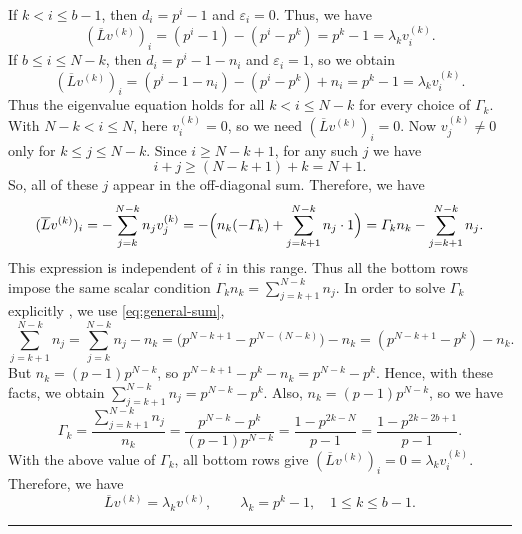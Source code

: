 \documentclass[12pt,twoside]{article}
\renewenvironment{proof}{{\noindent\bfseries Proof.}}{\qed}
\def\qed{\nolinebreak\hfill\rule{.2cm}{.2cm}\par\addvspace{.5cm}}
\begin{document}
\begin{proof}
	If $k<i\le b-1$, then $d_i=p^i-1$ and $\varepsilon_i=0$.
	Thus, we have
	\[
	(\overline{L}v^{(k)})_i
	= (p^i-1) - (p^i-p^k)
	= p^k-1
	= \lambda_k v^{(k)}_i.
	\]
	If $b\le i\le N-k$, then $d_i=p^i-1-n_i$ and
	$\varepsilon_i=1$, so we obtain 
	\[
	(\overline{L}v^{(k)})_i
	= (p^i-1-n_i) - (p^i-p^k) + n_i
	= p^k-1
	= \lambda_k v^{(k)}_i.
	\]
	Thus the eigenvalue equation holds for all $k<i\le N-k$ for every
	choice of $ \varGamma_k$. With $N-k < i\le N$, here $v^{(k)}_i=0$, so we need $(\overline{L}v^{(k)})_i=0$.
	Now $v^{(k)}_j\ne 0$ only for $k\le j\le N-k$. Since
	$i\ge N-k+1$, for any such $j$ we have
	\[
	i+j \ge (N-k+1)+k = N+1.
	\]
	So, all of these $j$ appear in the off-diagonal sum. Therefore, we have
	\[
	(\overline{L}v^{(k)})_i
	= -\sum_{j=k}^{N-k} n_j v^{(k)}_j
	= -\Bigl(n_k(- \varGamma_k) + \sum_{j=k+1}^{N-k} n_j\cdot1\Bigr)
	=  \varGamma_k n_k - \sum_{j=k+1}^{N-k} n_j.
	\]
	This expression is independent of $i$ in this range. Thus all the
	bottom rows impose the same scalar condition $	 \varGamma_k n_k = \sum_{j=k+1}^{N-k} n_j.$
	In order to  solve  $ \varGamma_k$ explicitly , we use \eqref{eq:general-sum},
	\[
	\sum_{j=k+1}^{N-k} n_j
	= \sum_{j=k}^{N-k} n_j - n_k
	= \bigl(p^{N-k+1}-p^{N-(N-k)}\bigr) - n_k
	= (p^{N-k+1}-p^k) - n_k.
	\]
	But $n_k=(p-1)p^{N-k}$, so $	p^{N-k+1}-p^k-n_k = p^{N-k}-p^k.$
	Hence, with these facts, we obtain $	\sum_{j=k+1}^{N-k} n_j = p^{N-k}-p^k.$ Also, $n_k = (p-1)p^{N-k}$, so we have
	\[
	 \varGamma_k
	= \frac{\sum_{j=k+1}^{N-k} n_j}{n_k}
	= \frac{p^{N-k}-p^k}{(p-1)p^{N-k}}
	= \frac{1-p^{2k-N}}{p-1}
	= \frac{1-p^{ 2k-2b+1}}{p-1}.
	\]
	With the above value of $ \varGamma_k$, all bottom rows give $(\overline{L}v^{(k)})_i=0=\lambda_k v^{(k)}_i$. Therefore, we have 
	\[
	\overline{L}v^{(k)} = \lambda_k v^{(k)},\qquad
	\lambda_k=p^k-1,\quad 1\le k\le b-1.
	\]
	
	\medskip
	

\end{proof}
\end{document}
